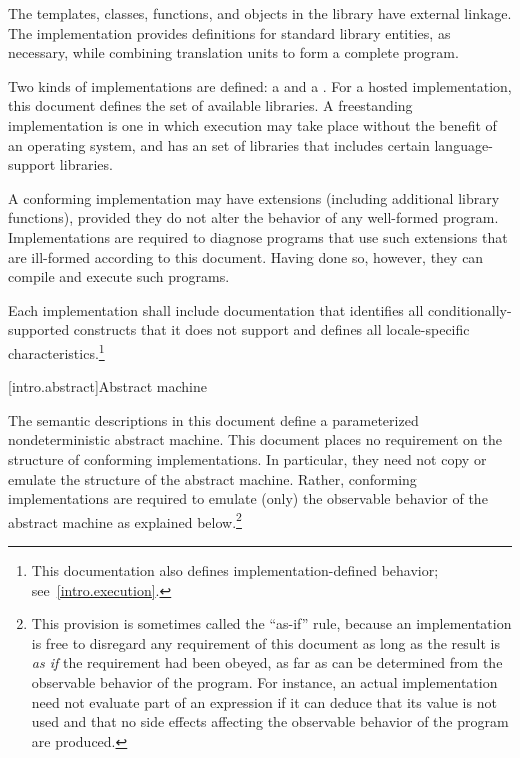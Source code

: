\pnum
The templates, classes, functions, and objects in the library have
external linkage. The implementation provides
definitions for standard library entities, as necessary, while combining
translation units to form a complete \Cpp{}  program.%

\pnum
Two kinds of implementations are defined: a  and a
. For a hosted implementation, this
document defines the set of available libraries. A freestanding
implementation is one in which execution may take place without the benefit of
an operating system, and has an  set of libraries that includes certain language-support
libraries.

\pnum
A conforming implementation may have extensions (including
additional library functions), provided they do not alter the
behavior of any well-formed program.
Implementations are required to diagnose programs that use such
extensions that are ill-formed according to this document.
Having done so, however, they can compile and execute such programs.

\pnum
Each implementation shall include documentation that identifies all
conditionally-supported constructs
that it does not support and defines all locale-specific characteristics.\footnote{This documentation also defines implementation-defined behavior;
see~\ref{intro.execution}.}%
%
%

[intro.abstract]{Abstract machine}

\pnum
{}%
%
The semantic descriptions in this document define a
parameterized nondeterministic abstract machine. This document
places no requirement on the structure of conforming
implementations. In particular, they need not copy or emulate the
structure of the abstract machine.
%
%
Rather, conforming implementations are required to emulate (only) the observable
behavior of the abstract machine as explained below.\footnote{This provision is
sometimes called the ``as-if'' rule, because an implementation is free to
disregard any requirement of this document as long as the result
is \emph{as if} the requirement had been obeyed, as far as can be determined
from the observable behavior of the program. For instance, an actual
implementation need not evaluate part of an expression if it can deduce that its
value is not used and that no
%
side effects affecting the
observable behavior of the program are produced.}

